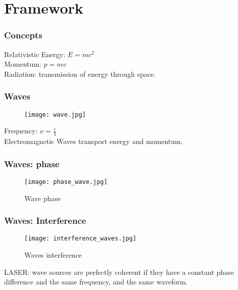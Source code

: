 \documentclass[10pt]{beamer}
\begin{document}
\section{Framework}
\begin{frame}
\frametitle{Concepts}
Relativistic Energy: $E = mc^2$\\
Momentum: $p = m v$\\
Radiation: transmission of energy through space.\\
\end{frame}

\begin{frame}
\frametitle{Waves}
\begin{figure}
\texttt{[image: wave.jpg]}
\end{figure}
Frequency: $\nu = \frac{c}{\lambda}$\\
Electromagnetic Waves transport energy and momentum. 
\end{frame}

\begin{frame}
\frametitle{Waves: phase}
\begin{figure}
\texttt{[image: phase\_wave.jpg]}
\caption{Wave phase}
\end{figure}
\end{frame}

\begin{frame}
\frametitle{Waves: Interference}
\begin{figure}
\texttt{[image: interference\_waves.jpg]}
\caption{Waves interference}
\end{figure}
\pause LASER: wave sources are perfectly \alert{coherent} if they have a constant phase difference and the same frequency, and the same waveform.
\end{frame}

\end{document}
